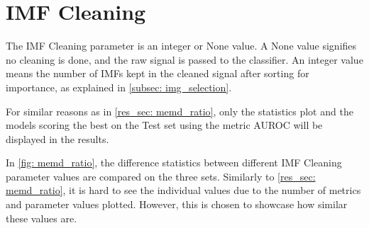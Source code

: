 \section{IMF Cleaning}
The IMF Cleaning parameter is an integer or None value. A None value signifies no cleaning is done, and the raw signal is passed to the classifier. An integer value means the number of IMFs kept in the cleaned signal after sorting for importance, as explained in 
\autoref{subsec: img_selection}.

For similar reasons as in \autoref{res_sec: memd_ratio}, only the statistics plot and the models scoring the best on the Test set using the metric AUROC will be displayed in the results. 

In \autoref{fig: memd_ratio}, the difference statistics between different IMF Cleaning parameter values are compared on the three sets. Similarly to \autoref{res_sec: memd_ratio}, it is hard to see the individual values due to the number of metrics and parameter values plotted. However, this is chosen to showcase how similar these values are. 

